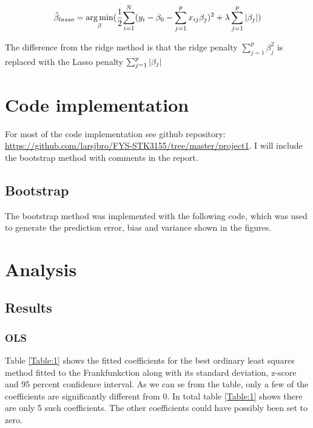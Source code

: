 \begin{equation}
\hat{\beta}_{lasso} =\operatorname*{arg\,min}_{\beta}(\frac{1}{2}{\sum_{i=1}^{N}(y_i - \beta_0 -\sum_{j=1}^{p}x_{ij}\beta_j)^2 + \lambda \sum_{j=1}^{p}\left| \beta_j \right|})
\end{equation}
\medskip

The difference from the ridge method is that the ridge penalty $\sum_{j=1}^{p}\beta_j^2$ is replaced with the Lasso penalty $\sum_{j=1}^{p}\left| \beta_j \right|$

\section{Code implementation}
For most of the code implementation see github repository: \href{https://github.com/larsjbro/FYS-STK3155/tree/master/project1}{https://github.com/larsjbro/FYS-STK3155/tree/master/project1}. I will include the bootstrap method with comments in the report.

\subsection{Bootstrap}

The bootstrap method was implemented with the following code, which was used to generate the prediction error, bias and variance shown in the figures.\newline




\medskip


\section{Analysis}


\subsection{Results}


\subsubsection{OLS}

Table \ref{Table:1} shows the fitted coefficients for the best ordinary least squares method fitted to the Frankfunkction along with its standard deviation, z-score and 95 percent confidence interval. As we can se from the table, only a few of the coefficients are significantly different from 0. In total table \ref{Table:1} shows there are only 5 such coefficients. The other coefficients could have possibly been set to zero.

